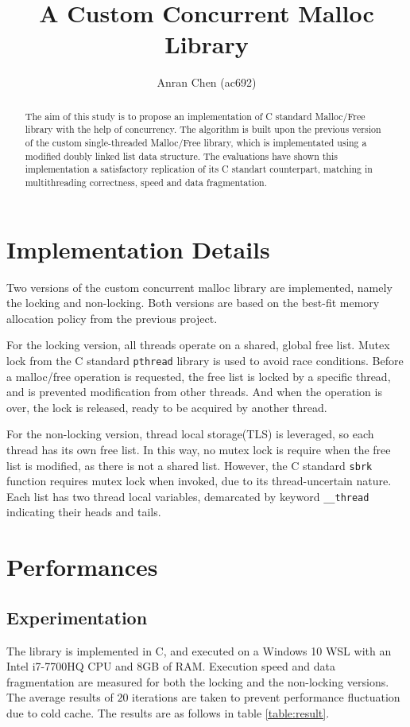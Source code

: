 \documentclass[12pt, letterpaper]{article}
\title{A Custom Concurrent Malloc Library}
\author{Anran Chen (ac692)}
\date{}
\begin{document}
  \maketitle
  \begin{abstract}
    The aim of this study is to propose an implementation of C standard Malloc/Free library
    with the help of concurrency. 
    The algorithm is built upon the previous version of the custom single-threaded Malloc/Free library,
    which is implementated using a modified doubly linked list data structure.
    The evaluations have shown this implementation a satisfactory replication of its C standart counterpart,
    matching in multithreading correctness, speed and data fragmentation. 
  \end{abstract}

  \section*{Implementation Details}
    Two versions of the custom concurrent malloc library are implemented, 
    namely the locking and non-locking. 
    Both versions are based on the best-fit memory allocation policy from the previous project. 

    For the locking version, all threads operate on a shared, global free list. 
    Mutex lock from the C standard \verb|pthread| library is used to avoid race conditions.
    Before a malloc/free operation is requested, the free list is locked by a specific thread,
    and is prevented modification from other threads. 
    And when the operation is over, the lock is released, ready to be acquired by another thread. 

    For the non-locking version, thread local storage(TLS) is leveraged, so each thread has its own free list.
    In this way, no mutex lock is require when the free list is modified, as there is not a shared list.
    However, the C standard \verb|sbrk| function requires mutex lock when invoked, due to its thread-uncertain nature.
    Each list has two thread local variables, demarcated by keyword \verb|__thread| indicating their heads and tails. 

  \section*{Performances}
    \subsection*{Experimentation}
      The library is implemented in C, and executed on a Windows 10 WSL with an Intel i7-7700HQ CPU and $8$GB of RAM.
      Execution speed and data fragmentation are measured for both the locking and the non-locking versions.
      The average results of $20$ iterations are taken to prevent performance fluctuation due to cold cache.
      The results are as follows in table \ref{table:result}.
\end{document}
